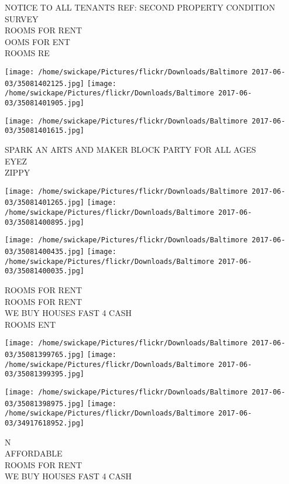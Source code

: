 \documentclass[10pt,letterpaper]{article}
\begin{document}
NOTICE TO ALL TENANTS REF: SECOND PROPERTY CONDITION SURVEY\\
ROOMS FOR RENT\\
OOMS FOR ENT\\
ROOMS RE\\
\pagebreak

\texttt{[image: /home/swickape/Pictures/flickr/Downloads/Baltimore 2017-06-03/35081402125.jpg]}
\texttt{[image: /home/swickape/Pictures/flickr/Downloads/Baltimore 2017-06-03/35081401905.jpg]}

\vspace{0.25in}
\texttt{[image: /home/swickape/Pictures/flickr/Downloads/Baltimore 2017-06-03/35081401615.jpg]}

SPARK AN ARTS AND MAKER BLOCK PARTY FOR ALL AGES\\
EYEZ\\
ZIPPY\\
\pagebreak

\texttt{[image: /home/swickape/Pictures/flickr/Downloads/Baltimore 2017-06-03/35081401265.jpg]}
\texttt{[image: /home/swickape/Pictures/flickr/Downloads/Baltimore 2017-06-03/35081400895.jpg]}

\texttt{[image: /home/swickape/Pictures/flickr/Downloads/Baltimore 2017-06-03/35081400435.jpg]}
\texttt{[image: /home/swickape/Pictures/flickr/Downloads/Baltimore 2017-06-03/35081400035.jpg]}

ROOMS FOR RENT\\
ROOMS FOR RENT\\
WE BUY HOUSES FAST 4 CASH\\
ROOMS ENT\\
\pagebreak

\texttt{[image: /home/swickape/Pictures/flickr/Downloads/Baltimore 2017-06-03/35081399765.jpg]}
\texttt{[image: /home/swickape/Pictures/flickr/Downloads/Baltimore 2017-06-03/35081399395.jpg]}

\texttt{[image: /home/swickape/Pictures/flickr/Downloads/Baltimore 2017-06-03/35081398975.jpg]}
\texttt{[image: /home/swickape/Pictures/flickr/Downloads/Baltimore 2017-06-03/34917618952.jpg]}

N\\
AFFORDABLE\\
ROOMS FOR RENT\\
WE BUY HOUSES FAST 4 CASH\\
\pagebreak
\end{document}

